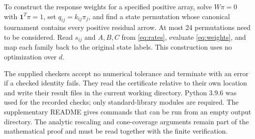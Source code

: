\documentclass[11pt,a4paper]{article}
\newcommand{\one}{\mathbf 1}
\begin{document}
To construct the response weights for a specified positive array, solve
$W\pi=0$ with $\one^T\pi=1$, set $q_{ij}=k_{ij}\pi_j$, and find a
state permutation whose canonical tournament contains every positive
residual arrow. At most 24 permutations need to be considered. Read
$s_{ij}$ and $A,B,C$ from \eqref{eq:rates}, evaluate \eqref{eq:weights},
and map each family back to the original state labels. This construction
uses no optimization over $d$.

The supplied checkers accept no numerical tolerance and terminate with
an error if a checked identity fails. They read the certificate relative
to their own location and write their result files in the current
working directory. Python 3.9.6 was used for the recorded checks; only
standard-library modules are required. The supplementary README gives
commands that can be run from an empty output directory. The analytic
rescaling and cone-coverage arguments remain part of the mathematical
proof and must be read together with the finite verification.

\begingroup
\raggedright


\endgroup
\end{document}
